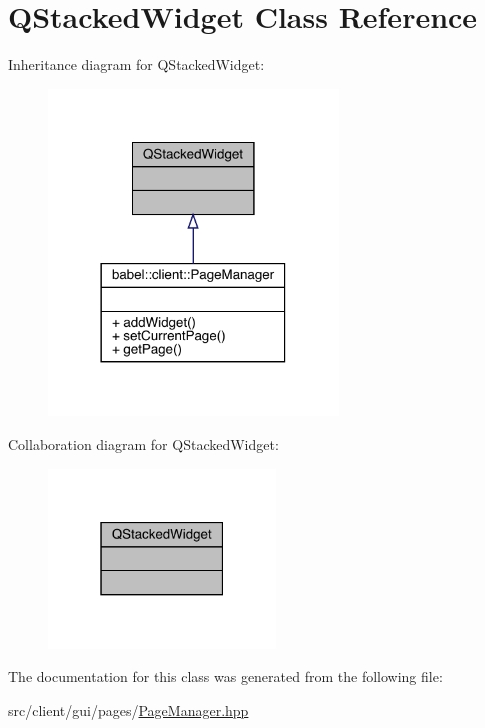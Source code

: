 \hypertarget{class_q_stacked_widget}{}\section{Q\+Stacked\+Widget Class Reference}
\label{class_q_stacked_widget}


Inheritance diagram for Q\+Stacked\+Widget\+:\nopagebreak
\begin{figure}[H]
\begin{center}
\leavevmode
\includegraphics[width=218pt]{class_q_stacked_widget__inherit__graph}
\end{center}
\end{figure}


Collaboration diagram for Q\+Stacked\+Widget\+:\nopagebreak
\begin{figure}[H]
\begin{center}
\leavevmode
\includegraphics[width=171pt]{class_q_stacked_widget__coll__graph}
\end{center}
\end{figure}


The documentation for this class was generated from the following file\+:\begin{DoxyCompactItemize}
\item 
src/client/gui/pages/\mbox{\hyperlink{_page_manager_8hpp}{Page\+Manager.\+hpp}}\end{DoxyCompactItemize}
